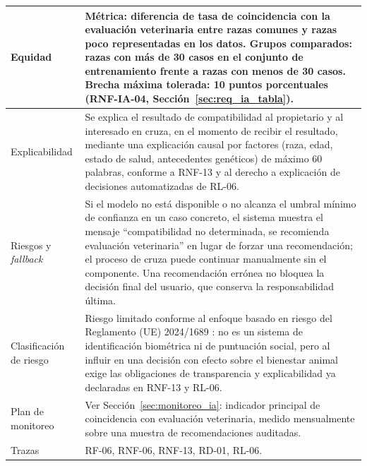 \documentclass[journal,onecolumn]{IEEEtran}
\begin{document}
\begin{table}[H]
\begin{tabularx}{\textwidth}{|L{4.2cm}|X|}
		\hline
		Equidad & Métrica: diferencia de tasa de coincidencia con la evaluación veterinaria entre razas comunes y razas poco representadas en los datos. Grupos comparados: razas con más de 30 casos en el conjunto de entrenamiento frente a razas con menos de 30 casos. Brecha máxima tolerada: 10 puntos porcentuales (RNF-IA-04, Sección~\ref{sec:req_ia_tabla}). \\
		\hline
		Explicabilidad & Se explica el resultado de compatibilidad al propietario y al interesado en cruza, en el momento de recibir el resultado, mediante una explicación causal por factores (raza, edad, estado de salud, antecedentes genéticos) de máximo 60 palabras, conforme a RNF-13 y al derecho a explicación de decisiones automatizadas de RL-06. \\
		\hline
		Riesgos y \textit{fallback} & Si el modelo no está disponible o no alcanza el umbral mínimo de confianza en un caso concreto, el sistema muestra el mensaje ``compatibilidad no determinada, se recomienda evaluación veterinaria'' en lugar de forzar una recomendación; el proceso de cruza puede continuar manualmente sin el componente. Una recomendación errónea no bloquea la decisión final del usuario, que conserva la responsabilidad última. \\
		\hline
		Clasificación de riesgo & Riesgo limitado conforme al enfoque basado en riesgo del Reglamento (UE) 2024/1689 \cite{euaiact2024}: no es un sistema de identificación biométrica ni de puntuación social, pero al influir en una decisión con efecto sobre el bienestar animal exige las obligaciones de transparencia y explicabilidad ya declaradas en RNF-13 y RL-06. \\
		\hline
		Plan de monitoreo & Ver Sección~\ref{sec:monitoreo_ia}: indicador principal de coincidencia con evaluación veterinaria, medido mensualmente sobre una muestra de recomendaciones auditadas. \\
		\hline
		Trazas & RF-06, RNF-06, RNF-13, RD-01, RL-06. \\
		\hline
	\end{tabularx}
\end{table}
\end{document}
